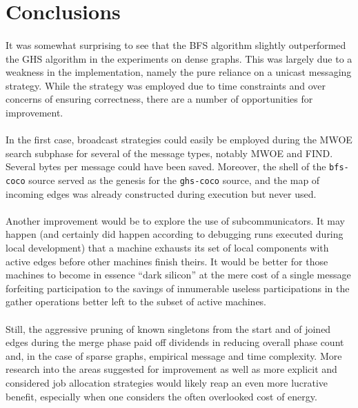 \documentclass[11pt,epsf]{article}
\begin{document}
\section{Conclusions}{
  \paragraph{}{
    It was somewhat surprising to see that the BFS algorithm slightly outperformed
    the GHS algorithm in the experiments on dense graphs. This was largely due to a
    weakness in the implementation, namely the pure reliance on a unicast messaging
    strategy. While the strategy was employed due to time constraints and over concerns
    of ensuring correctness, there are a number of opportunities for improvement.
  }
  \paragraph{}{
    In the first case, broadcast strategies could easily be employed during the MWOE
    search subphase for several of the message types, notably \textsc{MWOE} and
    \textsc{FIND}. Several bytes per message could have been saved. Moreover, the
    shell of the \texttt{bfs-coco} source served as the genesis for the \texttt{ghs-coco}
    source, and the map of incoming edges was already constructed during execution
    but never used.
  }
  \paragraph{}{
    Another improvement would be to explore the use of subcommunicators. It may happen
    (and certainly did happen according to debugging runs executed during local
    development) that a machine exhausts its set of local components with active edges
    before other machines finish theirs. It would be better for those machines to
    become in essence ``dark silicon'' at the mere cost of a single message forfeiting
    participation to the savings of innumerable useless participations in the gather
    operations better left to the subset of active machines.
  }
  \paragraph{}{
    Still, the aggressive pruning of known singletons from the start and of joined edges
    during the merge phase paid off dividends in reducing overall phase count and,
    in the case of sparse graphs, empirical message and time complexity. More research
    into the areas suggested for improvement as well as more explicit and considered
    job allocation strategies would likely reap an even more lucrative benefit, especially
    when one considers the often overlooked cost of energy.
  }
}
\end{document}
